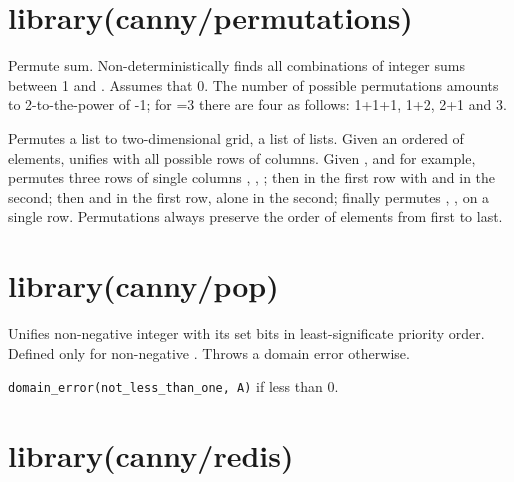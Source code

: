 \chapter{library(canny/permutations)}\label{sec:permutations}

\begin{description}
Permute sum. Non-deterministically finds all combinations of integer
sums between 1 and . Assumes that 0\Sel{}. The number of possible
permutations amounts to 2-to-the-power of -1; for =3 there are
four as follows: 1+1+1, 1+2, 2+1 and 3.

Permutes a list to two-dimensional grid, a list of lists. Given an
ordered  of elements, unifies  with all possible rows of
columns. Given ,  and  for example, permutes three rows of
single columns , , ; then  in the first row with  and
 in the second; then  and  in the first row,  alone in
the second; finally permutes , ,  on a single row.
Permutations always preserve the order of elements from first to
last.
\end{description}

\chapter{library(canny/pop)}\label{sec:pop}

\begin{description}
Unifies non-negative integer  with its set bits  in
least-significate priority order. Defined only for non-negative .
Throws a domain error otherwise.

\begin{tags}
\verb$domain_error(not_less_than_one, A)$ if  less than 0.
\end{tags}
\end{description}

\chapter{library(canny/redis)}\label{sec:redis}

